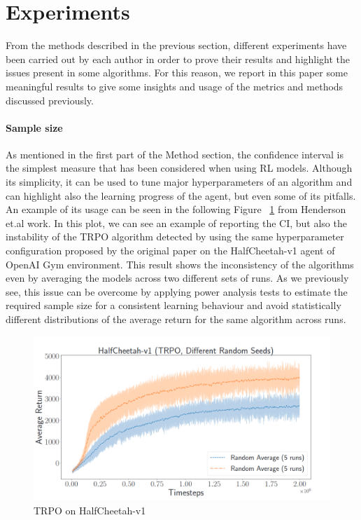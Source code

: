 \documentclass{article}
\begin{document}
\section{Experiments}
From the methods described in the previous section, different experiments have been carried out by each author in order to prove their results and highlight the issues present in some algorithms. For this reason, we report in this paper some meaningful results to give some insights and usage of the metrics and methods discussed previously.

\paragraph{Sample size}
As mentioned in the first part of the Method section, the confidence interval is the simplest measure that has been considered when using RL models. Although its simplicity, it can be used to tune major hyperparameters of an algorithm and can highlight also the learning progress of the agent, but even some of its pitfalls. An example of its usage can be seen in the following Figure ~\ref{fig:sample_size} from Henderson et.al work. In this plot, we can see an example of reporting the CI, but also the instability of the TRPO \cite{TRPO} algorithm detected by using the same hyperparameter configuration proposed by the original paper on the HalfCheetah-v1 agent of OpenAI Gym environment. This result shows the inconsistency of the algorithms even by averaging the models across two different sets of runs. As we previously see, this issue can be overcome by applying power analysis tests to estimate the required sample size for a consistent learning behaviour and avoid statistically different distributions of the average return for the same algorithm across runs.
\begin{figure}[!]
	\centering
	\includegraphics[scale=0.15]{./images/sample_size_dist.png}
	\caption{TRPO on HalfCheetah-v1~\cite{DRL01}}
	\label{fig:sample_size}
\end{figure}
\end{document}
